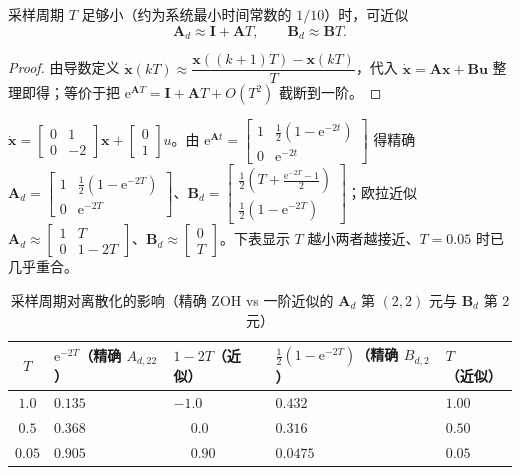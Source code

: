 \begin{theorem}\label{thm:ssb-euler}
采样周期 $T$ 足够小（约为系统最小时间常数的 $1/10$）时，可近似
\begin{equation}
  \mathbf{A}_d\approx\mathbf{I}+\mathbf{A}T,\qquad \mathbf{B}_d\approx\mathbf{B}T.
  \label{eq:ssb-euler}
\end{equation}
\end{theorem}
\begin{proof}
由导数定义 $\dot{\mathbf{x}}(kT)\approx\dfrac{\mathbf{x}((k{+}1)T)-\mathbf{x}(kT)}{T}$，代入 $\dot{\mathbf{x}}=\mathbf{A}\mathbf{x}+\mathbf{B}\mathbf{u}$ 整理即得；等价于把 $\mathrm{e}^{\mathbf{A}T}=\mathbf{I}+\mathbf{A}T+O(T^2)$ 截断到一阶。
\end{proof}

\begin{example}\label{ex:ssb-discretize}
$\dot{\mathbf{x}}=\begin{bmatrix}0&1\\0&-2\end{bmatrix}\mathbf{x}+\begin{bmatrix}0\\1\end{bmatrix}u$。由 $\mathrm{e}^{\mathbf{A}t}=\begin{bmatrix}1&\tfrac12(1-\mathrm{e}^{-2t})\\0&\mathrm{e}^{-2t}\end{bmatrix}$ 得精确
$\mathbf{A}_d=\begin{bmatrix}1&\tfrac12(1-\mathrm{e}^{-2T})\\0&\mathrm{e}^{-2T}\end{bmatrix}$、$\mathbf{B}_d=\begin{bmatrix}\tfrac12(T+\tfrac{\mathrm{e}^{-2T}-1}{2})\\\tfrac12(1-\mathrm{e}^{-2T})\end{bmatrix}$；欧拉近似 $\mathbf{A}_d\approx\begin{bmatrix}1&T\\0&1-2T\end{bmatrix}$、$\mathbf{B}_d\approx\begin{bmatrix}0\\T\end{bmatrix}$。下表显示 $T$ 越小两者越接近、$T=0.05$ 时已几乎重合。
\begin{table}[H]\centering\small
\caption{采样周期对离散化的影响（精确 ZOH vs 一阶近似的 $\mathbf{A}_d$ 第 $(2,2)$ 元与 $\mathbf{B}_d$ 第 2 元）}
\label{tab:ssb-discretize}
\begin{tabularx}{\linewidth}{cLLLL}
\toprule
$T$ & $\mathrm{e}^{-2T}$（精确 $A_{d,22}$）& $1-2T$（近似）& $\tfrac12(1-\mathrm{e}^{-2T})$（精确 $B_{d,2}$）& $T$（近似）\\
\midrule
$1.0$  & $0.135$ & $-1.0$ & $0.432$  & $1.00$  \\
$0.5$  & $0.368$ & $\phantom{-}0.0$  & $0.316$  & $0.50$  \\
$0.05$ & $0.905$ & $\phantom{-}0.90$ & $0.0475$ & $0.05$  \\
\bottomrule
\end{tabularx}
\end{table}
\end{example}

